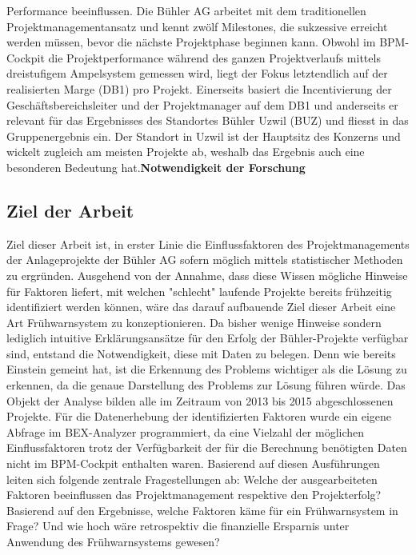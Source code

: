 Performance beeinflussen. Die Bühler AG arbeitet mit dem traditionellen Projektmanagementansatz und kennt zwölf Milestones, die sukzessive erreicht werden müssen, bevor die nächste Projektphase beginnen kann. Obwohl im BPM-Cockpit die Projektperformance während des ganzen Projektverlaufs mittels dreistufigem Ampelsystem gemessen wird, liegt der Fokus letztendlich auf der realisierten Marge (DB1) pro Projekt. Einerseits basiert die Incentivierung der Geschäftsbereichsleiter und der Projektmanager auf dem DB1 und anderseits er relevant für das Ergebnisses des Standortes Bühler Uzwil (BUZ) und fliesst in das Gruppenergebnis ein. Der Standort in Uzwil ist der Hauptsitz des Konzerns und wickelt zugleich am meisten Projekte ab, weshalb das Ergebnis auch eine besonderen Bedeutung hat.\textbf{Notwendigkeit der Forschung}
\subsection{Ziel der Arbeit}
Ziel dieser Arbeit ist, in erster Linie die Einflussfaktoren des Projektmanagements der Anlageprojekte der Bühler AG sofern möglich mittels statistischer Methoden zu ergründen. Ausgehend von der Annahme, dass diese Wissen mögliche Hinweise für Faktoren liefert, mit welchen "schlecht" laufende Projekte bereits frühzeitig identifiziert werden können, wäre das darauf aufbauende Ziel dieser Arbeit eine Art Frühwarnsystem zu konzeptionieren. Da bisher wenige Hinweise sondern lediglich intuitive Erklärungsansätze für den Erfolg der Bühler-Projekte verfügbar sind, entstand die Notwendigkeit, diese mit Daten zu belegen. Denn wie bereits Einstein gemeint hat, ist die Erkennung des Problems wichtiger als die Lösung zu erkennen, da die genaue Darstellung des Problems zur Lösung führen würde. Das Objekt der Analyse bilden alle im Zeitraum von 2013 bis 2015 abgeschlossenen Projekte. Für die Datenerhebung der identifizierten Faktoren wurde ein eigene Abfrage im BEX-Analyzer programmiert, da eine Vielzahl der möglichen Einflussfaktoren trotz der Verfügbarkeit der für die Berechnung benötigten Daten nicht im BPM-Cockpit enthalten waren. Basierend auf diesen Ausführungen leiten sich folgende zentrale Fragestellungen ab:
\newline\newline
Welche der ausgearbeiteten Faktoren beeinflussen das Projektmanagement respektive den Projekterfolg? Basierend auf den Ergebnisse, welche Faktoren käme für ein Frühwarnsystem in Frage? Und wie hoch wäre retrospektiv die finanzielle Ersparnis unter Anwendung des Frühwarnsystems gewesen?
